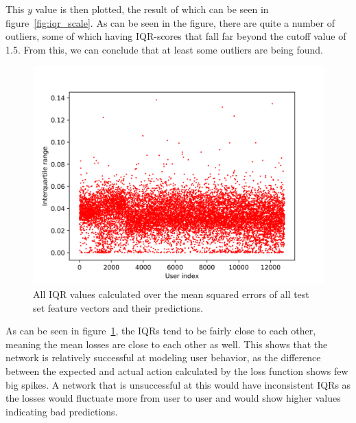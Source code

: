 This \(y\) value is then plotted, the result of which can be seen in figure~\ref{fig:iqr_scale}. As can be seen in the figure, there are quite a number of outliers, some of which having IQR-scores that fall far beyond the cutoff value of 1.5. From this, we can conclude that at least some outliers are being found. 

\begin{figure}
	\begin{center}
		\includegraphics[scale=1.6]{results/iqrs}
	\end{center}
	\caption{All IQR values calculated over the mean squared errors of all test set feature vectors and their predictions.~\label{fig:iqrs}}
\end{figure}

As can be seen in figure~\ref{fig:iqrs}, the IQRs tend to be fairly close to each other, meaning the mean losses are close to each other as well. This shows that the network is relatively successful at modeling user behavior, as the difference between the expected and actual action calculated by the loss function shows few big spikes. A network that is unsuccessful at this would have inconsistent IQRs as the losses would fluctuate more from user to user and would show higher values indicating bad predictions.

